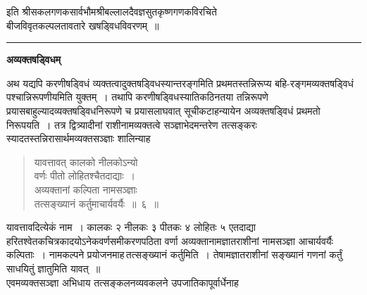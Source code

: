 \documentclass[11pt, openany]{book}
\begin{document}
\begin{center}
 इति श्रीसकलगणकसार्वभौमश्रीबल्लालदैवज्ञसुतकृष्णगणकविरचिते \\
  बीजविवृतकल्पलतावतारे खषड्विधविवरणम्~॥\\
 
 \vspace{4mm}
 \rule{0.2\linewidth}{0.7pt}
\end{center}

\newpage

\thispagestyle{empty}
 \label{avyakta}
\begin{center}
    \textbf{\LARGE अव्यक्तषड्विधम्  }
\end{center}
 
 \vspace{2mm}
 अथ यद्यपि करणीषड्विधं व्यक्तत्वादुक्तषड्विधस्यान्तरङ्गमिति 
प्रथमतस्तन्निरूप्य बहि-रङ्गमव्यक्तषड्विधं पश्चान्निरूपणीयमिति युक्तम्~।
तथापि करणीषड्विधस्यातिकठिनतया तन्निरूपणे \;प्रयासबाहुल्यादव्यक्तषड्विधनिरूपणे \;च \;प्रयासलाघवात् \;सूचीकटाहन्यायेन अव्यक्तषड्विधं प्रथमतो निरूपयति~। 
तत्र द्वित्र्यादीनां राशीनामव्यक्तत्वे सञ्ज्ञाभेदमन्तरेण तत्सङ्करः
स्यादतस्तन्निरासार्थमव्यक्तसञ्ज्ञाः शालिन्याह\textendash  
\begin{quote}
    \bs
     यावत्तावत् कालको नीलकोऽन्यो \\

\vspace{-7mm}
\hspace{1cm} वर्णः पीतो लोहितश्चैतदाद्याः~। \\

 \vspace{-7mm}
 अव्यक्तानां कल्पिता नामसञ्ज्ञाः\\

\vspace{-7mm}
\hspace{1cm} तत्सङ्ख्यानं कर्तुमाचार्यवर्यैः~॥~६~॥
\end{quote}

 यावत्तावदित्येकं नाम~। कालकः २ नीलकः ३ पीतकः ४ लोहितः ५ 
एतदाद्या हरितश्वेतकचित्रकादयोऽनेकवर्णसमीकरणपठिता वर्णा अव्यक्तानामज्ञातराशीनां नामसञ्ज्ञा आचार्यवर्यैः कल्पिताः~। नामकल्पने प्रयोजनमाह\textendash \,तत्सङ्ख्यानं कर्तुमिति~। तेषामज्ञातराशीनां सङ्ख्यानं गणनां कर्तुं
साधयितुं ज्ञातुमिति यावत्~॥ \\

\vspace{-3mm}
 एवमव्यक्तसञ्ज्ञा अभिधाय तत्सङ्कलनव्यवकलने उपजातिकापूर्वार्धेनाह\textendash  
\end{document}
